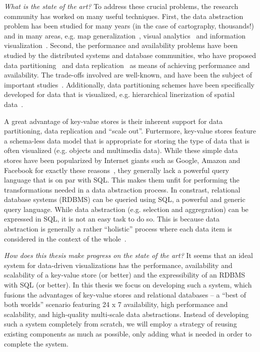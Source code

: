 \documentclass[11pt, oneside]{report}
\begin{document}
\emph{What is the state of the art?} To address these crucial problems, the research community has worked on many useful techniques. First, the data abstraction problem has been studied for many years (in the case of cartography, thousands!) and in many areas, e.g. map generalization~\cite{weibel}, visual analytics~\cite{see:db} and information visualization~\cite{metro:stops}. Second, the performance and availability problems have been studied by the distributed systems and database communities, who have proposed data partitioning~\cite{foo} and data replication~\cite{foo} as means of achieving performance and availability. The trade-offs involved are well-known, and have been the subject of important studies~\cite{danger:of:replication, cap:theorem}. Additionally, data partitioning schemes have been specifically developed for data that is visualized, e.g. hierarchical linerization of spatial data~\cite{hilbert:curve, z:curve, xyz:protocol}. 

A great advantage of key-value stores is their inherent support for data partitioning, data replication and ``scale out''. Furtermore, key-value stores feature a schema-less data model that is appropriate for storing the type of data that is often visualized (e.g. objects and multimedia data). While these simple data stores have been popularized by Internet giants such as Google, Amazon and Facebook for exactly these reasons~\cite{dynamodb, bigtable, haystack}, they generally lack a powerful query language that is on par with SQL. This makes them unfit for performing the transformations needed in a data abstraction process. In constrast, relational database systems (RDBMS) can be queried using SQL, a powerful and generic query language. While data abstraction (e.g. selection and aggregration) can be expressed in SQL, it is not an easy task to do so. This is because data abstraction is generally a rather ``holistic'' process where each data item is considered in the context of the whole~\cite{conflicts:principles}.

\emph{How does this thesis make progress on the state of the art?} It seems that an ideal system for data-driven visualizations has the performance, availability and scalability of a key-value store (or better) and the expressibility of an RDBMS with SQL (or better). In this thesis we focus on developing such a system, which fusions the advantages of key-value stores and relational databases -- a ``best of both worlds'' scenario featuring 24 x 7 availability, high performance and scalability, and high-quality multi-scale data abstractions. Instead of developing such a system completely from scratch, we will employ a strategy of reusing existing components as much as possible, only adding what is needed in order to complete the system.
\end{document}
